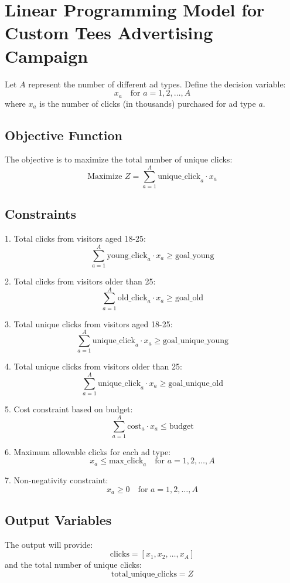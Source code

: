 \documentclass{article}
\begin{document}
\section*{Linear Programming Model for Custom Tees Advertising Campaign}

Let \( A \) represent the number of different ad types. Define the decision variable:
\[
x_a \quad \text{for } a = 1, 2, \ldots, A
\]
where \( x_a \) is the number of clicks (in thousands) purchased for ad type \( a \).

\subsection*{Objective Function}
The objective is to maximize the total number of unique clicks:
\[
\text{Maximize } Z = \sum_{a=1}^{A} \text{unique\_click}_{a} \cdot x_a
\]

\subsection*{Constraints}

1. Total clicks from visitors aged 18-25:
\[
\sum_{a=1}^{A} \text{young\_click}_{a} \cdot x_a \geq \text{goal\_young}
\]

2. Total clicks from visitors older than 25:
\[
\sum_{a=1}^{A} \text{old\_click}_{a} \cdot x_a \geq \text{goal\_old}
\]

3. Total unique clicks from visitors aged 18-25:
\[
\sum_{a=1}^{A} \text{unique\_click}_{a} \cdot x_a \geq \text{goal\_unique\_young}
\]

4. Total unique clicks from visitors older than 25:
\[
\sum_{a=1}^{A} \text{unique\_click}_{a} \cdot x_a \geq \text{goal\_unique\_old}
\]

5. Cost constraint based on budget:
\[
\sum_{a=1}^{A} \text{cost}_{a} \cdot x_a \leq \text{budget}
\]

6. Maximum allowable clicks for each ad type:
\[
x_a \leq \text{max\_click}_{a} \quad \text{for } a = 1, 2, \ldots, A
\]

7. Non-negativity constraint:
\[
x_a \geq 0 \quad \text{for } a = 1, 2, \ldots, A
\]

\subsection*{Output Variables}
The output will provide:
\[
\text{clicks} = [x_{1}, x_{2}, \ldots, x_{A}]
\]
and the total number of unique clicks:
\[
\text{total\_unique\_clicks} = Z
\]
\end{document}
